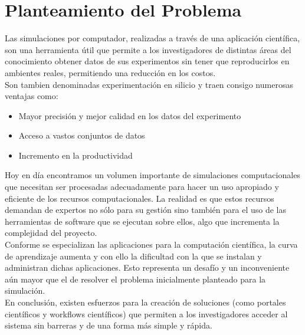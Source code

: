 \section{Planteamiento del Problema}


Las simulaciones por computador, realizadas a través de una aplicación científica, son una herramienta útil que permite a los investigadores de distintas áreas del conocimiento obtener datos de sus experimentos sin tener que reproducirlos en ambientes reales, permitiendo una reducción en los costos.\\

Son tambien denominadas experimentación en silicio y traen consigo numerosas ventajas como\cite{Tavera}:

\begin{itemize}
\item Mayor precisión y mejor calidad en los datos del experimento
\item Acceso a vastos conjuntos de datos
\item Incremento en la productividad
\end{itemize}

Hoy en día encontramos un volumen importante de simulaciones computacionales que necesitan ser procesadas adecuadamente para hacer un uso apropiado y eficiente de los recursos computacionales. La realidad es que estos recursos demandan de expertos no sólo para su gestión sino también para el uso de las herramientas de software que se ejecutan sobre ellos, algo que incrementa la complejidad del proyecto.\\

Conforme se especializan las aplicaciones para la computación científica, la curva de aprendizaje aumenta y con ello la dificultad con la que se instalan y administran dichas aplicaciones. Esto representa un desafío y un inconveniente aún mayor que el de resolver el problema inicialmente planteado para la simulación.\\

En conclusión, existen esfuerzos para la creación de soluciones (como portales científicos y workflows científicos) que permiten a los investigadores acceder al sistema sin barreras y de una forma más simple y rápida.

